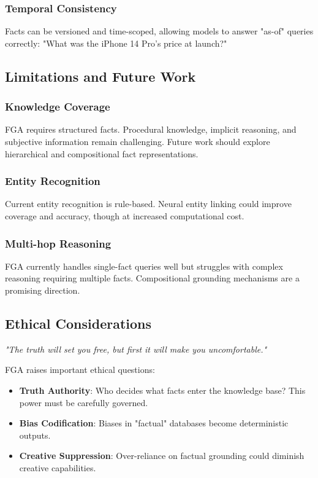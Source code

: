 \documentclass[11pt, a4paper]{article}
\theoremstyle{definition}
\begin{document}
\subsubsection{Temporal Consistency}
Facts can be versioned and time-scoped, allowing models to answer "as-of" queries correctly: "What was the iPhone 14 Pro's price at launch?"

\subsection{Limitations and Future Work}

\subsubsection{Knowledge Coverage}
FGA requires structured facts. Procedural knowledge, implicit reasoning, and subjective information remain challenging. Future work should explore hierarchical and compositional fact representations.

\subsubsection{Entity Recognition}
Current entity recognition is rule-based. Neural entity linking could improve coverage and accuracy, though at increased computational cost.

\subsubsection{Multi-hop Reasoning}
FGA currently handles single-fact queries well but struggles with complex reasoning requiring multiple facts. Compositional grounding mechanisms are a promising direction.

\subsection{Ethical Considerations}

\textit{"The truth will set you free, but first it will make you uncomfortable."}

FGA raises important ethical questions:

\begin{itemize}
    \item \textbf{Truth Authority}: Who decides what facts enter the knowledge base? This power must be carefully governed.
    \item \textbf{Bias Codification}: Biases in "factual" databases become deterministic outputs.
    \item \textbf{Creative Suppression}: Over-reliance on factual grounding could diminish creative capabilities.
\end{itemize}
\end{document}

